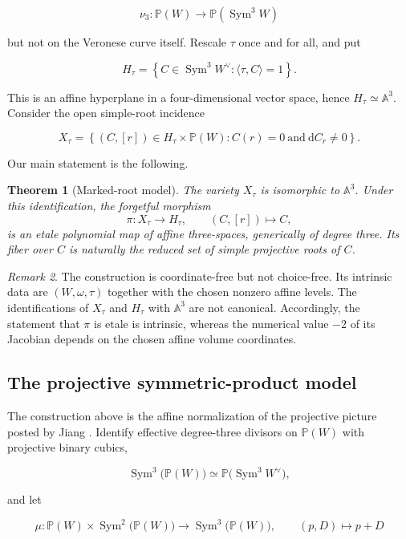 \documentclass[11pt,a4paper]{article}
\newtheorem{theorem}{Theorem}[section]
\theoremstyle{remark}
\newtheorem{remark}[theorem]{Remark}
\DeclareMathOperator{\Sym}{Sym}
\newcommand{\A}{\mathbb A}
\newcommand{\PP}{\mathbb P}
\newcommand{\dd}{\mathrm d}
\begin{document}
\[
  \nu_3\colon\PP(W)\longrightarrow\PP(\Sym^3W)
\]

but not on the Veronese curve itself.  Rescale $\tau$ once and for all, and
put

\[
  H_\tau=
  \left\{C\in\Sym^3W^\vee:\langle\tau,C\rangle=1\right\}.
\]

This is an affine hyperplane in a four-dimensional vector space, hence
$H_\tau\simeq\A^3$.  Consider the open simple-root incidence

\[
  X_\tau=
  \left\{(C,[r])\in H_\tau\times\PP(W):
  C(r)=0\ \text{and}\ \dd C_r\ne0\right\}.
\]

Our main statement is the following.

\begin{theorem}[Marked-root model]\label{thm:main}
The variety $X_\tau$ is isomorphic to $\A^3$.  Under this identification,
the forgetful morphism
\[
  \pi\colon X_\tau\longrightarrow H_\tau,
  \qquad (C,[r])\longmapsto C,
\]
is an etale polynomial map of affine three-spaces, generically of degree
three.  Its fiber over $C$ is naturally the reduced set of simple projective
roots of $C$.
\end{theorem}

\begin{remark}\label{rem:choices}
The construction is coordinate-free but not choice-free.  Its intrinsic data
are $(W,\omega,\tau)$ together with the chosen nonzero affine levels.  The
identifications of $X_\tau$ and $H_\tau$ with $\A^3$ are not canonical.
Accordingly, the statement that $\pi$ is etale is intrinsic, whereas the
numerical value $-2$ of its Jacobian depends on the chosen affine volume
coordinates.
\end{remark}

\subsection{The projective symmetric-product model}

The construction above is the affine normalization of the projective picture
posted by Jiang \cite{Jiang}.  Identify effective degree-three divisors on
$\PP(W)$ with projective binary cubics,

\[
  \Sym^3\!\bigl(\PP(W)\bigr)
  \simeq \PP\!\bigl(\Sym^3W^\vee\bigr),
\]

and let

\[
  \mu\colon \PP(W)\times\Sym^2\!\bigl(\PP(W)\bigr)
  \longrightarrow \Sym^3\!\bigl(\PP(W)\bigr),
  \qquad (p,D)\longmapsto p+D
\]
\end{document}
